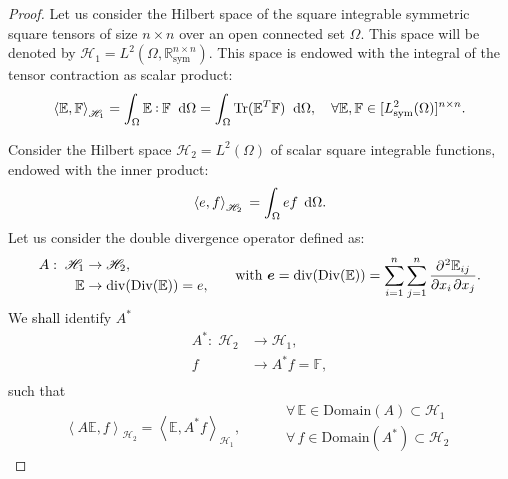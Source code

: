\documentclass[11pt]{article}
\DeclareMathOperator{\Tr}{Tr}
\newcommand{\revOne}[1]{\textcolor{black}{#1}}
\def\onedot{$\mathsurround0pt\ldotp$}
\def\cddot{%
	\mathbin{\vcenter{\baselineskip.67ex
			\hbox{\onedot}\hbox{\onedot}}%
}}
\begin{document}
	\begin{proof}
		Let us consider the Hilbert space of the square integrable symmetric square tensors of size $n \times n$ over an open connected set $\Omega$. This space will be denoted by $\mathscr{H}_1 = L^2(\Omega, \mathbb{R}^{n \times n}_{\text{sym}})$. This space is endowed with the integral of the tensor contraction as scalar product:
		\[\left\langle \mathbb{E} , \mathbb{F} \right\rangle_{\mathscr{H}_1} = \int_{\Omega}  \mathbb{E} \cddot \mathbb{F} \; \d{\Omega} = \int_{\Omega} \Tr(\mathbb{E}^T \mathbb{F}) \; \d{\Omega}, \quad \forall  \mathbb{E} , \mathbb{F} \in [L^2_{\text{sym}}(\Omega)]^{n \times n}. \]
		
		Consider the Hilbert space $\mathscr{H}_2 =L^2(\Omega)$ of scalar square integrable functions, endowed with the inner product:
		\begin{equation}
		\left\langle e,f \right\rangle_{\mathscr{H}_2}  \,= \int_{\Omega} e f \, \d{\Omega}.
		\end{equation} 
		Let us consider the double divergence operator defined as: 
		\[
		\begin{aligned}
		A: \; \mathscr{H}_1& \rightarrow \mathscr{H}_2, \\
		\mathbb{E}& \rightarrow \mathrm{div}(\mathrm{Div}(\mathbb{E})) = e, \\	\end{aligned}
		\qquad \text{with } \bm{e} = \mathrm{div}(\mathrm{Div}(\mathbb{E})) = \sum_{i = 1}^n \sum_{j = 1}^n \diffp{\mathbb{E}_{ij}}{x_i,x_j}.
		\]
		We \revOne{shall} identify $A^*$
		\[
		\begin{aligned}
		A^*: \; \mathscr{H}_2& \rightarrow \mathscr{H}_1, \\
		f& \rightarrow  A^* f = \mathbb{F}, \\
		\end{aligned}
		\]
		such that \[
		\left\langle A \mathbb{E} , f \right\rangle_{\mathscr{H}_2} = \left\langle \mathbb{E} , A^* f \right\rangle_{\mathscr{H}_1},
		\begin{aligned} \qquad
		&\forall \,\mathbb{E} \in \mathrm{Domain}(A) \subset \mathscr{H}_1 \\
		&\forall \,f \in \mathrm{Domain}(A^*) \subset \mathscr{H}_2
		\end{aligned}
		\]
		

\end{proof}
\end{document}

